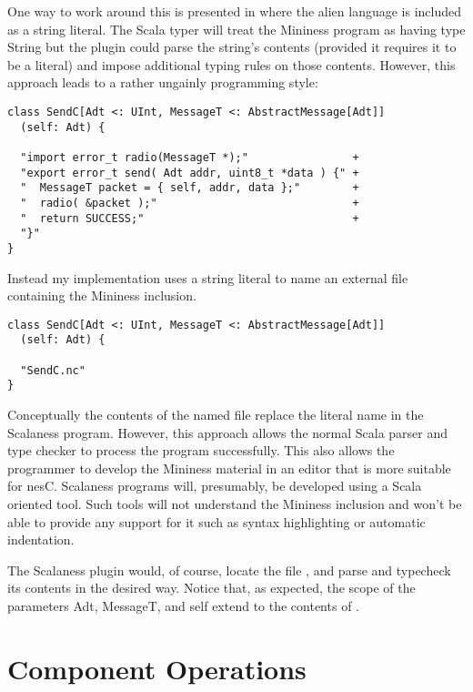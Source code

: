 One way to work around this is presented in \cite{Garcia-Scala-Query} where the alien language
is included as a string literal. The Scala typer will treat the Mininess program as having type
String but the plugin could parse the string's contents (provided it requires it to be a
literal) and impose additional typing rules on those contents. However, this approach leads to a
rather ungainly programming style:

\singlespace
\begin{lstlisting}[language=scalaness]
class SendC[Adt <: UInt, MessageT <: AbstractMessage[Adt]]
  (self: Adt) {

  "import error_t radio(MessageT *);"                +
  "export error_t send( Adt addr, uint8_t *data ) {" +
  "  MessageT packet = { self, addr, data };"        +
  "  radio( &packet );"                              +
  "  return SUCCESS;"                                +
  "}"
}
\end{lstlisting}
\primaryspacing

Instead my implementation uses a string literal to name an external file containing the Mininess
inclusion.

\singlespace
\begin{lstlisting}[language=scalaness]
class SendC[Adt <: UInt, MessageT <: AbstractMessage[Adt]]
  (self: Adt) {

  "SendC.nc"
}
\end{lstlisting}
\primaryspacing

Conceptually the contents of the named file replace the literal name in the Scalaness program.
However, this approach allows the normal Scala parser and type checker to process the program
successfully. This also allows the programmer to develop the Mininess material in an editor that
is more suitable for nesC. Scalaness programs will, presumably, be developed using a Scala
oriented tool. Such tools will not understand the Mininess inclusion and won't be able to
provide any support for it such as syntax highlighting or automatic indentation.

The Scalaness plugin would, of course, locate the file , and parse and
typecheck its contents in the desired way. Notice that, as expected, the scope of the parameters
Adt, MessageT, and self extend to the contents of .


\section{Component Operations}


